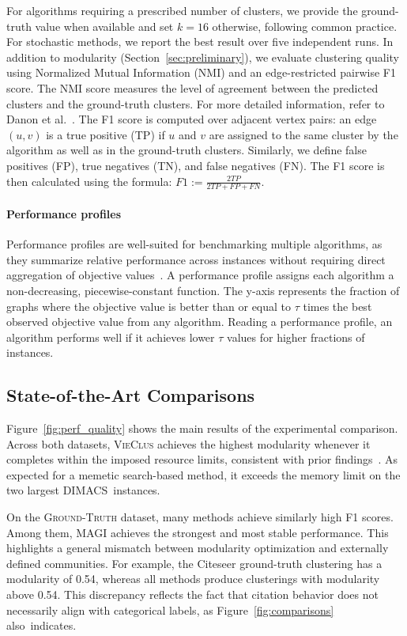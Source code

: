 \documentclass[../paper.tex]{subfiles}
\begin{document}
For algorithms requiring a prescribed number of clusters, we provide the ground-truth value when available and set $k=16$ otherwise, following common practice. For stochastic methods, we report the best result over five independent runs. In addition to modularity (Section~\ref{sec:preliminary}), we evaluate clustering quality using Normalized Mutual Information (NMI) and an edge-restricted pairwise F1 score. The NMI score measures the level of agreement between the predicted clusters and the ground-truth clusters. For more detailed information, refer to Danon et al.~\cite{danon2005comparing}. The F1 score is computed over adjacent vertex pairs: an edge $(u,v)$ is a true positive (TP) if $u$ and $v$ are assigned to the same cluster by the algorithm as well as in the ground-truth clusters. Similarly, we define false positives (FP), true negatives (TN), and false negatives (FN). The F1 score is then calculated using the formula:  $F1 := \frac{2TP}{2TP + FP + FN}$.

\paragraph*{\textbf{Performance profiles}}

Performance profiles are well-suited for benchmarking multiple algorithms, as they summarize relative performance across instances without requiring direct aggregation of objective values~\cite{perf2002}. A performance profile assigns each algorithm a non-decreasing, piecewise-constant function. The y-axis represents the fraction of graphs where the objective value is better than or equal to $\tau$ times the best observed objective value from any algorithm. Reading a performance profile, an algorithm performs well if it achieves lower $\tau$ values for higher fractions of instances.

\subsection{State-of-the-Art Comparisons}

Figure~\ref{fig:perf_quality} shows the main results of the experimental comparison. Across both datasets, \textsc{VieClus} achieves the highest modularity whenever it completes within the imposed resource limits, consistent with prior findings~\cite{vieclus2018,maxsat2025}. As expected for a memetic search-based method, it exceeds the memory limit on the two largest \hbox{DIMACS instances.}

On the \textsc{Ground-Truth} dataset, many methods achieve similarly high F1 scores. Among them, \textsc{MAGI} achieves the strongest and most stable performance. This highlights a general mismatch between modularity optimization and externally defined communities. For example, the Citeseer ground-truth clustering has a modularity of 0.54, whereas all methods produce clusterings with modularity above 0.54. This discrepancy reflects the fact that citation behavior does not necessarily align with categorical labels, as Figure~\ref{fig:comparisons} \hbox{also indicates.}
\end{document}
